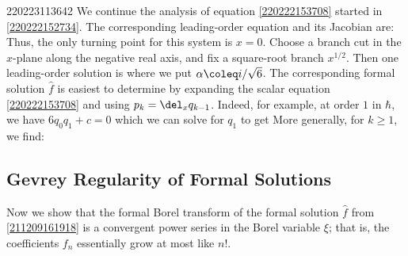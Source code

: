 \documentclass[11pt]{article}
\begin{document}
\begin{example}{220223113642}
We continue the analysis of equation \eqref{220222153708} started in \autoref{220222152734}.
The corresponding leading-order equation and its Jacobian are:
Thus, the only turning point for this system is $x = 0$.
Choose a branch cut in the $x$-plane along the negative real axis, and fix a square-root branch $x^{1/2}$.
Then one leading-order solution is
where we put $\alpha \coleq i / \sqrt{6}$.
The corresponding formal solution $\hat{f}$ is easiest to determine by expanding the scalar equation \eqref{220222153708} and using $p_k = \del_x q_{k-1}$.
Indeed, for example, at order $1$ in $\hbar$, we have $6q_0 q_1 + c = 0$ which we can solve for $q_1$ to get
More generally, for $k \geq 1$, we find: 
\end{example}

\subsection{Gevrey Regularity of Formal Solutions}

Now we show that the formal Borel transform of the formal solution $\hat{f}$ from \eqref{211209161918} is a convergent power series in the Borel variable $\xi$; that is, the coefficients $f_n$ essentially grow at most like $n!$.
\end{document}
